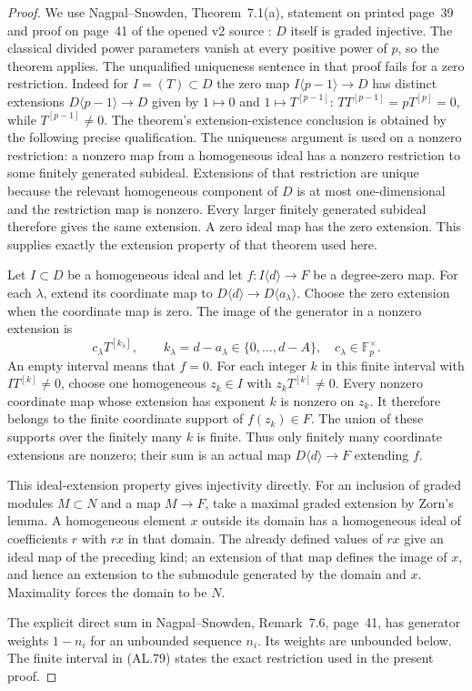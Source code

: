 \begin{proof}
We use Nagpal--Snowden, Theorem~7.1(a), statement on
printed page~39 and proof on page~41 of the opened v2
source \cite{IC-nagpal-snowden}: $D$ itself is graded
injective. The classical divided power parameters vanish
at every positive power of $p$, so the theorem applies.
The unqualified uniqueness sentence in that proof fails
for a zero restriction. Indeed for $I=(T)\subset D$
the zero map $I\langle p-1\rangle\to D$ has distinct
extensions $D\langle p-1\rangle\to D$ given by
$1\mapsto0$ and $1\mapsto T^{[p-1]}$:
$T T^{[p-1]}=pT^{[p]}=0$, while $T^{[p-1]}\ne0$.
The theorem's extension-existence conclusion is obtained
by the following precise qualification. The uniqueness
argument is used on a nonzero restriction: a nonzero map from a
homogeneous ideal has a nonzero restriction to some
finitely generated subideal. Extensions of that restriction
are unique because the relevant homogeneous component
of $D$ is at most one-dimensional and the restriction
map is nonzero. Every larger finitely generated subideal
therefore gives the same extension. A zero ideal map has
the zero extension. This supplies exactly the extension
property of that theorem used here.

Let $I\subset D$ be a homogeneous ideal and let
$f:I\langle d\rangle\to F$ be a degree-zero map.
For each $\lambda$, extend its coordinate map to
$D\langle d\rangle\to D\langle a_\lambda\rangle$.
Choose the zero extension when the coordinate map is
zero. The image of the generator in a nonzero extension
is
\[
 c_\lambda T^{[k_\lambda]},\qquad
 k_\lambda=d-a_\lambda\in\{0,\ldots,d-A\},
 \quad c_\lambda\in\mathbb F_p^\times .
 \tag{AL.79}
\]
An empty interval means that $f=0$.
For each integer $k$ in this finite interval with
$I T^{[k]}\ne0$, choose one homogeneous $z_k\in I$
with $z_kT^{[k]}\ne0$. Every nonzero coordinate map
whose extension has exponent $k$ is nonzero on $z_k$.
It therefore belongs to the finite coordinate support
of $f(z_k)\in F$. The union of these supports over the
finitely many $k$ is finite. Thus only finitely many
coordinate extensions are nonzero; their sum is an
actual map $D\langle d\rangle\to F$ extending $f$.

This ideal-extension property gives injectivity directly.
For an inclusion of graded modules $M\subset N$ and a
map $M\to F$, take a maximal graded extension by Zorn's
lemma. A homogeneous element $x$ outside its domain has
a homogeneous ideal of coefficients $r$ with $rx$ in
that domain. The already defined values of $rx$ give
an ideal map of the preceding kind; an extension of
that map defines the image of $x$, and hence an extension
to the submodule generated by the domain and $x$.
Maximality forces the domain to be $N$.

The explicit direct sum in Nagpal--Snowden, Remark~7.6,
page~41, has generator weights $1-n_i$ for an unbounded
sequence $n_i$. Its weights are unbounded below. The
finite interval in (AL.79) states the exact restriction
used in the present proof.
\end{proof}

